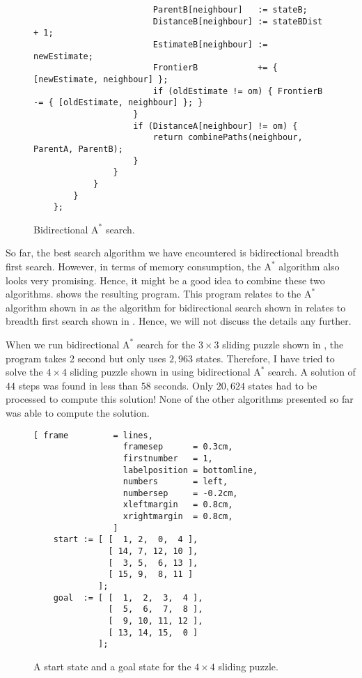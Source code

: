 \begin{figure}[!ht]
\begin{Verbatim}
                        ParentB[neighbour]   := stateB;
                        DistanceB[neighbour] := stateBDist + 1;
                        EstimateB[neighbour] := newEstimate;
                        FrontierB            += { [newEstimate, neighbour] };
                        if (oldEstimate != om) { FrontierB -= { [oldEstimate, neighbour] }; }
                    }
                    if (DistanceA[neighbour] != om) {
                        return combinePaths(neighbour, ParentA, ParentB);
                    }
                }        
            }
        }
    };
\end{Verbatim}
\vspace*{-0.3cm}
\caption{Bidirectional $\mathrm{A}^*$ search.}
\label{fig:a-star-bidirectional.stlx}
\end{figure}
So far, the best search algorithm we have encountered is bidirectional breadth first search.  However, in terms
of memory consumption, the $\mathrm{A}^*$ algorithm also looks very promising.  Hence, it might be a good idea
to combine these two algorithms.   shows the resulting program.  This program
relates to the $\mathrm{A}^*$ algorithm shown in  as the algorithm for bidirectional
search shown in  relates to breadth first search shown in .
Hence, we will not discuss the details any further.

When we run bidirectional $\mathrm{A}^*$ search for the $3 \times 3$ sliding puzzle shown in
, the program takes 2 second but only uses $2,963$ states.  Therefore, I have tried 
to solve the $4 \times 4$ sliding puzzle shown in  using
bidirectional $\mathrm{A}^*$ search.  A solution of $44$ steps was found in less than $58$ seconds.
Only $20,624$ states had to be processed to compute this solution!  None of the other algorithms presented so
far was able to compute the solution.



\begin{figure}[!ht]
\centering
\begin{Verbatim}[ frame         = lines, 
                  framesep      = 0.3cm, 
                  firstnumber   = 1,
                  labelposition = bottomline,
                  numbers       = left,
                  numbersep     = -0.2cm,
                  xleftmargin   = 0.8cm,
                  xrightmargin  = 0.8cm,
                ]
    start := [ [  1, 2,  0,  4 ],
               [ 14, 7, 12, 10 ],
               [  3, 5,  6, 13 ],
               [ 15, 9,  8, 11 ]
             ];
    goal  := [ [  1,  2,  3,  4 ],
               [  5,  6,  7,  8 ],
               [  9, 10, 11, 12 ],
               [ 13, 14, 15,  0 ]
             ];
\end{Verbatim}
\vspace*{-0.3cm}
\caption{A start state and a goal state for the $4 \times 4$ sliding puzzle.}
\label{fig:start-goal.stlx}
\end{figure}
\pagebreak


